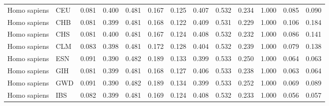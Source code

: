 \begin{longtable}{llrrrrrrrrrrr}
        Homo sapiens &                       CEU &                              0.081 &                               0.400 &                 0.481 &                 0.167 &                              0.125 &                               0.407 &                 0.532 &                 0.234 &   1.000 &  0.085 &  0.090 \\
        Homo sapiens &                       CHB &                              0.081 &                               0.399 &                 0.481 &                 0.168 &                              0.122 &                               0.409 &                 0.531 &                 0.229 &   1.000 &  0.106 &  0.184 \\
        Homo sapiens &                       CHS &                              0.081 &                               0.400 &                 0.481 &                 0.167 &                              0.124 &                               0.408 &                 0.532 &                 0.232 &   1.000 &  0.086 &  0.141 \\
        Homo sapiens &                       CLM &                              0.083 &                               0.398 &                 0.481 &                 0.172 &                              0.128 &                               0.404 &                 0.532 &                 0.239 &   1.000 &  0.079 &  0.138 \\
        Homo sapiens &                       ESN &                              0.091 &                               0.390 &                 0.482 &                 0.189 &                              0.133 &                               0.399 &                 0.533 &                 0.250 &   1.000 &  0.064 &  0.063 \\
        Homo sapiens &                       GIH &                              0.081 &                               0.399 &                 0.481 &                 0.168 &                              0.127 &                               0.406 &                 0.533 &                 0.238 &   1.000 &  0.063 &  0.064 \\
        Homo sapiens &                       GWD &                              0.091 &                               0.390 &                 0.482 &                 0.189 &                              0.134 &                               0.399 &                 0.533 &                 0.252 &   1.000 &  0.069 &  0.089 \\
        Homo sapiens &                       IBS &                              0.082 &                               0.399 &                 0.481 &                 0.169 &                              0.124 &                               0.408 &                 0.532 &                 0.233 &   1.000 &  0.056 &  0.057 \\

\end{longtable}
